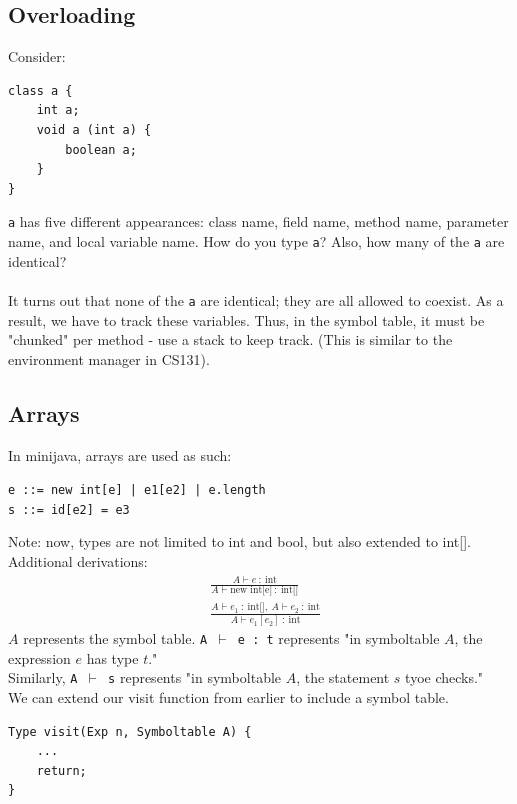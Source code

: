 \documentclass[10pt]{article}
\begin{document}
\subsection*{Overloading}
Consider:
\begin{verbatim}
class a {
    int a;
    void a (int a) {
        boolean a;
    }
}
\end{verbatim}
\texttt{a} has five different appearances: class name, field name, method name, parameter name, and local variable name.  How do you type \texttt{a}?  Also, how many of the \texttt{a} are identical?\\\\
It turns out that none of the \texttt{a} are identical; they are all allowed to coexist.  As a result, we have to track these variables.  Thus, in the symbol table, it must be "chunked" per method - use a stack to keep track.  (This is similar to the environment manager in CS131).

\subsection*{Arrays}
In minijava, arrays are used as such:
\begin{center}
    \texttt{e ::= new int[e] | e1[e2] | e.length}\\
    \texttt{s ::= id[e2] = e3}
\end{center}
Note: now, types are not limited to int and bool, but also extended to int[].\\
Additional derivations:
\begin{align*}
    &\frac{A \vdash e \::\: \text{int}}{A \vdash \text{new int[e]} \::\: \text{int[]}}\\
    &\frac{A \vdash e_1 \::\: \text{int[]}, \:A \vdash e_2 \::\: \text{int}}{A \vdash e_1[e_2]\::\: \text{int}}
\end{align*}
$A$ represents the symbol table.
\texttt{A $\vdash$ e : t} represents "in symboltable $A$, the expression $e$ has type $t$."\\
Similarly, \texttt{A $\vdash$ s} represents "in symboltable $A$, the statement $s$ tyoe checks."\\
We can extend our visit function from earlier to include a symbol table.
\begin{verbatim}
Type visit(Exp n, Symboltable A) {
    ...
    return;
}
\end{verbatim}
\end{document}
